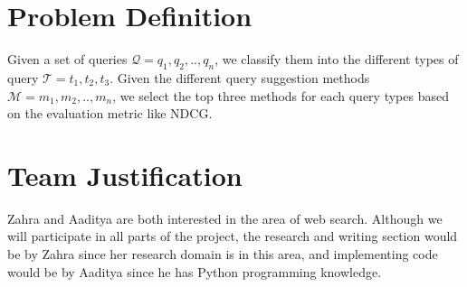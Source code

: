 \documentclass[sigconf]{acmart}
\begin{document}
\section{Problem Definition}
Given a set of queries $\mathcal{Q}={q_1, q_2,..,q_n}$, we classify them into the different types of query $\mathcal{T}={t_1, t_2,t_3}$. Given the different query suggestion methods $\mathcal{M}={m_1, m_2, ..,m_n}$, we select the top three methods for each query types based on the evaluation metric like NDCG.

\section{Team Justification}
Zahra and Aaditya are both interested in the area of web search. Although we will participate in all parts of the project, the research and writing section would be by Zahra since her research domain is in this area, and implementing code would be by Aaditya since he has Python programming knowledge. 

 
\end{document}
